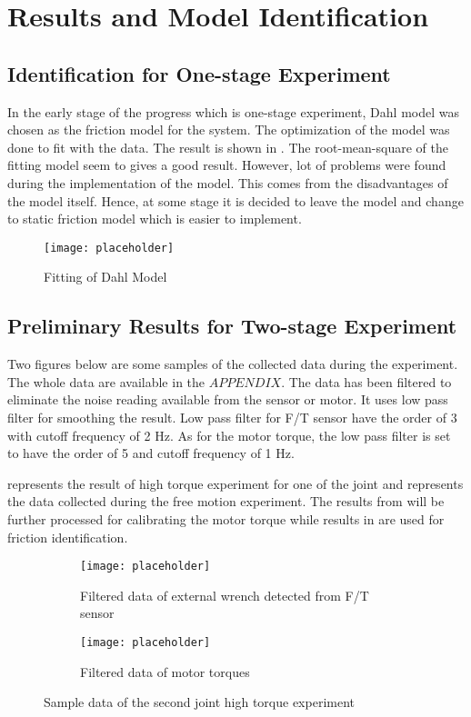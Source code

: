 \chapter{Results and Model Identification}
\section{Identification for One-stage Experiment}
In the early stage of the progress which is one-stage experiment, Dahl model was chosen as the friction model for the system. The optimization of the model was done to fit with the data. The result is shown in . The root-mean-square of the fitting model seem to gives a good result. However, lot of problems were found during the implementation of the model. This comes from the disadvantages of the model itself. Hence, at some stage it is decided to leave the model and change to static friction model which is easier to implement.

\begin{figure}[h]
    \centering
    \texttt{[image: placeholder]}
    \caption{Fitting of Dahl Model}
    \label{fig: Dahl model fit}
\end{figure}



\section{Preliminary Results for Two-stage Experiment}
Two figures below are some samples of the collected data during the experiment. The whole data are available in the $APPENDIX$. The data has been filtered to eliminate the noise reading available from the sensor or motor. It uses low pass filter for smoothing the result. Low pass filter for F/T sensor have the order of 3 with cutoff frequency of 2 Hz. As for the motor torque, the low pass filter is set to have the order of 5 and cutoff frequency of 1 Hz.

 represents the result of high torque experiment for one of the joint and  represents the data collected during the free motion experiment. The results from  will be further processed for calibrating the motor torque while results in  are used for friction identification.

\begin{figure}[h]
  \begin{subfigure}[t]{0.5\textwidth}
    \centering
    \texttt{[image: placeholder]} 
    \caption{Filtered data of external wrench detected from F/T sensor}
  \end{subfigure}
  \begin{subfigure}[t]{0.5\textwidth}
    \centering
    \texttt{[image: placeholder]}
    \caption{Filtered data of motor torques}
  \end{subfigure}
  \caption{Sample data of the second joint high torque experiment}
  \label{fig: push result}
\end{figure}

